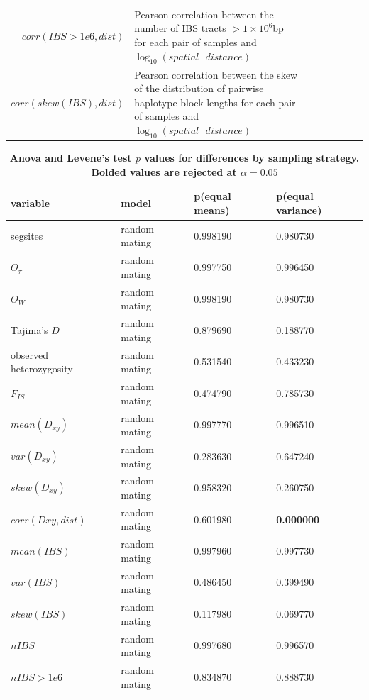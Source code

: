 \documentclass[10pt,twoside,lineno,hidelinks]{preprint}
\begin{document}
\begin{table}
\begin{tabular}{rllrrrrr}
$corr(IBS>1e6,dist)$ & \makecell[l]{Pearson correlation between the number of IBS tracts $> 1\times10^6$bp \\for each pair of samples and $\log_{10}(spatial\text{ }distance)$} \\
$corr(skew(IBS),dist)$ & \makecell[l]{Pearson correlation between the skew of the distribution of pairwise haplotype\\ block lengths for each pair of samples and $\log_{10}(spatial\text{ }distance)$} \\
\end{tabular}
\label{table:sumstats}
\end{table}


\begin{table}[htbp]
\tiny
\centering
\caption{\bf Anova and Levene's test $p$ values for differences by sampling strategy. Bolded values are rejected at $\alpha=0.05$}
\begin{tableminipage}{\textwidth}
\begin{tabularx}{\textwidth}{XXXX}
  \hline
 variable & model & p(equal means) & p(equal variance) \\ 
  \hline
segsites & random mating & 0.998190 & 0.980730 \\ 
$\Theta_{\pi}$ & random mating & 0.997750 & 0.996450 \\ 
$\Theta_{W}$ & random mating & 0.998190 & 0.980730 \\ 
Tajima's $D$ & random mating & 0.879690 & 0.188770 \\ 
observed heterozygosity & random mating & 0.531540 & 0.433230 \\ 
$F_{IS}$ & random mating & 0.474790 & 0.785730 \\ 
$mean(D_{xy})$ & random mating & 0.997770 & 0.996510 \\ 
$var(D_{xy})$ & random mating & 0.283630 & 0.647240 \\ 
$skew(D_{xy})$ & random mating & 0.958320 & 0.260750 \\ 
$corr(Dxy,dist)$ & random mating & 0.601980 &\textbf{0.000000} \\ 
$mean(IBS)$ & random mating & 0.997960 & 0.997730 \\ 
$var(IBS)$ & random mating & 0.486450 & 0.399490 \\ 
$skew(IBS)$ & random mating & 0.117980 & 0.069770 \\ 
$nIBS$ & random mating & 0.997680 & 0.996570 \\ 
$nIBS>1e6$ & random mating & 0.834870 & 0.888730 \\ 

\end{tabularx}
\end{tableminipage}
\end{table}
\end{document}
